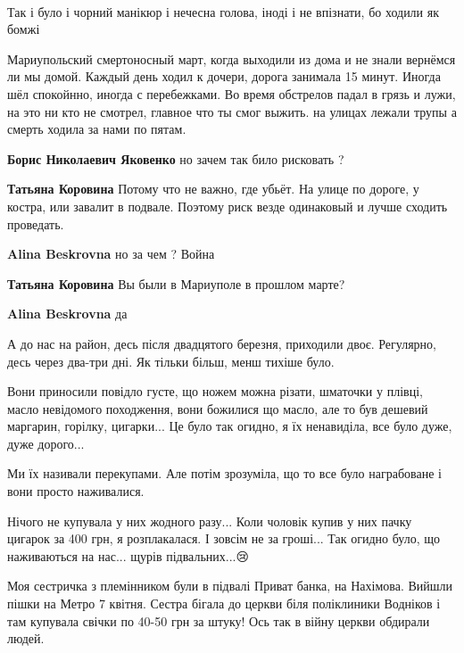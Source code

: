 🥺😥🙏🏻


Так і було і чорний манікюр і нечесна голова, іноді і не впізнати, бо ходили як бомжі


Мариупольский смертоносный март, когда выходили из дома и не знали вернёмся ли
мы домой. Каждый день ходил к дочери, дорога занимала 15 минут. Иногда шёл
спокойнно, иногда с перебежками. Во время обстрелов падал в грязь и лужи, на
это ни кто не смотрел, главное что ты смог выжить. на улицах лежали трупы а
смерть ходила за нами по пятам.

\begin{itemize} %
\textbf{Борис Николаевич Яковенко} но зачем так било рисковать ?

\textbf{Татьяна Коровина} Потому что не важно, где убьёт. На улице по дороге, у костра, или завалит в подвале. Поэтому риск везде одинаковый и лучше сходить проведать.

\textbf{Alina Beskrovna} но за чем ? Война

\textbf{Татьяна Коровина} Вы были в Мариуполе в прошлом марте?

\textbf{Alina Beskrovna} да
\end{itemize} %


А до нас на район, десь після двадцятого березня, приходили двоє. Регулярно,
десь через два-три дні. Як тільки більш, менш тихіше було.

Вони приносили повідло густе, що ножем можна різати, шматочки у плівці, масло
невідомого походження, вони божилися що масло, але то був дешевий маргарин,
горілку, цигарки... Це було так огидно, я їх ненавиділа, все було дуже, дуже
дорого...

Ми їх називали перекупами. Але потім зрозуміла, що то все було награбоване і
вони просто наживалися.

Нічого не купувала у них жодного разу... Коли чоловік купив у них пачку цигарок
за 400 грн, я розплакалася. І зовсім не за гроші... Так огидно було, що
наживаються на нас... щурів підвальних...😢


Моя сестричка з племінником були в підвалі Приват банка, на Нахімова. Вийшли
пішки на Метро 7 квітня. Сестра бігала до церкви біля поліклиники Водніков і
там купувала свічки по 40-50 грн за штуку! Ось так в війну церкви обдирали
людей.

